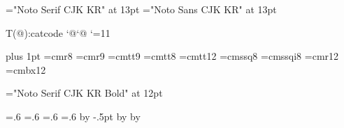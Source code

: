 
\def\tangref{3} %



\font\hgtitlefont="Noto Serif CJK KR" at 13pt
\font\hgttitlefont="Noto Sans CJK KR" at 13pt
\let\otitlefont=\titlefont \def\titlefont{\otitlefont\hgtitlefont}
\let\ottitlefont=\ttitlefont \def\ttitlefont{\ottitlefont}
\let\orgninerm=\ninerm \def\ninerm{\ninemj\orgninerm}
\let\orgeightrm=\eightrm \def\eightrm{\eightmj\orgeightrm}
\let\orgsc=\sc \def\sc{\eightsn\orgsc}
\let\orgtentex=\tentex \def\tentex{\ninesn\orgtentex}
\let\orguppercase=\uppercase \def\uppercase{\sc\orguppercase}

\expandafter\edef\csname AT(@):catcode\endcsname
  {\noexpand\catcode`@\the\catcode`@}
\catcode`\@=11

\def\CEE/{{C\spacefactor1000}}
\def\CPLUSPLUS/{{\CEE/\PP\spacefactor1000}}

\def\page{\box255 } \normalbottom
\parskip 0pt plus 1pt
\def\RA{\char'31 } %
\def\hang{\hangindent 4em\ignorespaces}
\font\eightrm=cmr8
\font\ninerm=cmr9
\font\ninett=cmtt9
\font\eighttt=cmtt8
\font\twelvett=cmtt12
\font\quoterm=cmssq8
\font\quoteit=cmssqi8
\font\authorfont=cmr12
\font\sectionfont=cmbx12

\font\hgsectionfont="Noto Serif CJK KR Bold" at 12pt

\def\pb{\.{|...|}}
\def\v{\.{\char'174}} %
\def\lpile{\def\cr{\hfill\endline}\matrix} %
\abovedisplayskip=.6\abovedisplayskip
\belowdisplayskip=.6\belowdisplayskip
\abovedisplayshortskip=.6\abovedisplayshortskip
\belowdisplayshortskip=.6\belowdisplayshortskip
\advance\baselineskip by -.5pt
\advance\pageheight by \baselineskip %
\advance\fullpageheight by \baselineskip
\setpage

\outer{}

\def\lheader{\mainfont\the\pageno\hfill\runninghead\hfill}
\def\rheader{\hfill\runninghead\hfill\mainfont\the\pageno}
\def\runninghead{{\tt CWEB} \ninesn 사용자 설명서 (버전 3.64)}

